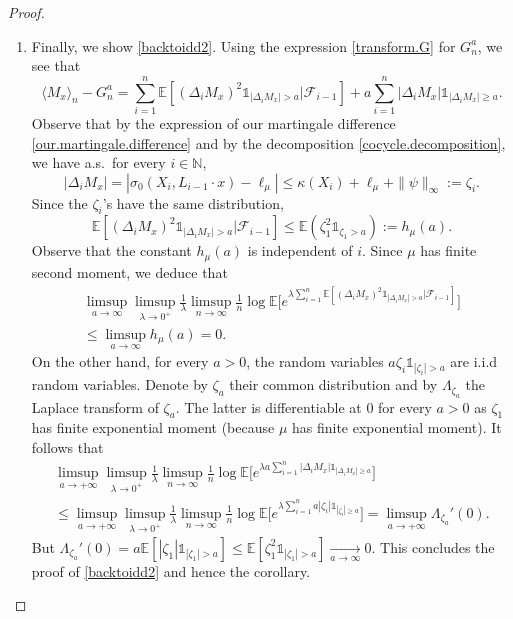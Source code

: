 \documentclass[JEP,XML,SOM,Unicode,published]{cedram}
\newenvironment{enumeratei}
{\bgroup\def\theenumi{\roman{enumi}}\def\theenumii{\arabic{enumii}}\begin{enumerate}}
{\end{enumerate}\egroup}
\theoremstyle{plain}
\theoremstyle{definition}
\newcommand\E{\mathbb{E}}
\newcommand\N{\mathbb{N}}
\begin{document}
\begin{proof}
\begin{enumeratei}
\item
Finally, we show \eqref{backtoidd2}. Using the expression \eqref{transform.G} for $G_n^a$, we see that
\[
\langle M_x \rangle_n - G_n^a = \sum_{i=1}^n{\E[(\Delta_i M_x)^2 \mathds{1}_{|\Delta_i M_x|>a} | \mathcal{F}_{i-1}] + a \sum_{i=1}^n{|\Delta_i M_x|} \mathds{1}_{|\Delta_i M_x|\geq a}}.
\]
Observe that by the expression of
our martingale difference \eqref{our.martingale.difference} and by the decomposition \eqref{cocycle.decomposition},
we have a.s.~for every $i\in \N$,
\begin{equation}\label{equation.upper.MDS}|\Delta_i M_x|= |\sigma_0(X_i, L_{i-1}\cdot x)-\ell_\mu|\leq
\kappa(X_i)+\ell_\mu+\|\psi\|_{\infty}:=\zeta_i.\end{equation}
Since the $\zeta_i$'s have the same distribution,
\[
\E[(\Delta_i M_x)^2 \mathds{1}_{|\Delta_i M_x|>a} | \mathcal{F}_{i-1}]\leq \E(\zeta_1^2 \mathds{1}_{\zeta_1>a}):=h_{\mu}(a).
\]
Observe that the constant $h_{\mu}(a)$ is independent of $i$. Since $\mu$ has finite second moment, we deduce that
\begin{multline}\label{quedire1}
\limsup_{a \to \infty}\limsup_{\lambda \to 0^+}\frac{1}{\lambda} \limsup_{n\to \infty} \frac{1}{n} \log \E\bigl[e^{\lambda \sum_{i=1}^n \mathbb{E}[(\Delta_i M_x)^2 \mathds{1}_{|\Delta_i M_x|>a} | \mathcal{F}_{i-1}]}\bigr]\\
\leq \limsup_{a\to \infty}{h_{\mu}(a)}=0.
\end{multline}
On the other hand, for every $a>0$, the random variables $a\zeta_i\mathds{1}_{|\zeta_i|>a}$ are i.i.d random variables. Denote by $\zeta_a$ their common distribution and by $\Lambda_{\zeta_a}$ the Laplace transform of $\zeta_a$. The latter is differentiable at $0$ for every $a>0$ as $\zeta_1$ has finite exponential moment (because $\mu$ has finite exponential moment).
It follows that
\begin{multline}\label{link}
\limsup_{a\to +\infty} \limsup_{\lambda \to 0^+}\frac{1}{\lambda} \limsup_{n\to \infty} \frac{1}{n} \log \E\bigl[e^{\lambda a \sum_{i=1}^n{|\Delta_i M_x| \mathds{1}_{|\Delta_i M_x|\geq a}}}\bigr]\\
\leq 
\limsup_{a\to +\infty} \limsup_{\lambda \to 0^+}\frac{1}{\lambda} \limsup_{n\to \infty} \frac{1}{n} \log \E\bigl[e^{\lambda \sum_{i=1}^n{ a |\zeta_i| \mathds{1}_{|\zeta_i|\geq a}}}\bigr] =
\limsup_{a\to +\infty} \Lambda_{\zeta_a}'(0).
\end{multline}
But $\Lambda_{\zeta_a}'(0)=a\E[|\zeta_1| \mathds{1}_{|\zeta_1|>a}]\leq \E[\zeta_1^2 \mathds{1}_{|\zeta_1|>a}]\xrightarrow[a\to \infty]{} 0$. This concludes the proof of \eqref{backtoidd2} and hence the corollary.\qedhere
\end{enumeratei}
\end{proof}
\end{document}
